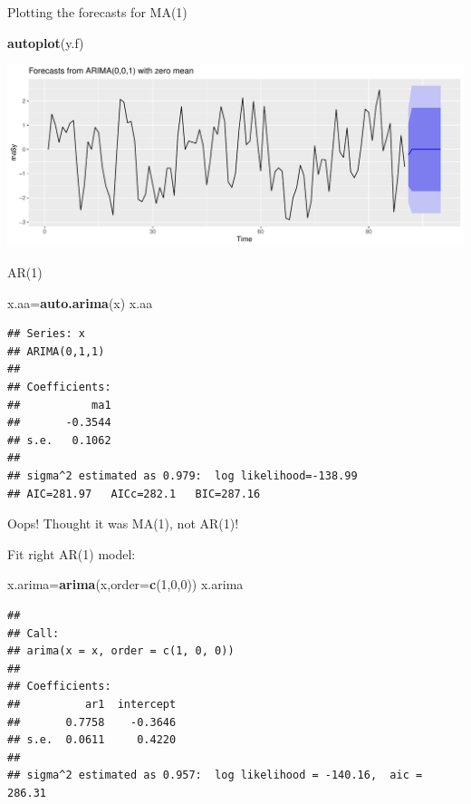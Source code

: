 \documentclass[
  ignorenonframetext,
]{beamer}
\newenvironment{Shaded}{\begin{snugshade}}{\end{snugshade}}
\newcommand{\DataTypeTok}[1]{\textcolor[rgb]{0.13,0.29,0.53}{#1}}
\newcommand{\DecValTok}[1]{\textcolor[rgb]{0.00,0.00,0.81}{#1}}
\newcommand{\KeywordTok}[1]{\textcolor[rgb]{0.13,0.29,0.53}{\textbf{#1}}}
\newcommand{\NormalTok}[1]{#1}
\begin{document}
\begin{frame}[fragile]{Plotting the forecasts for MA(1)}
\protect\hypertarget{plotting-the-forecasts-for-ma1}{}

\begin{Shaded}
\begin{Highlighting}[]
\KeywordTok{autoplot}\NormalTok{(y.f)}
\end{Highlighting}
\end{Shaded}

\includegraphics{slides_d29_files/figure-beamer/unnamed-chunk-567-1.pdf}

\end{frame}

\begin{frame}[fragile]{AR(1)}
\protect\hypertarget{ar1}{}

\begin{Shaded}
\begin{Highlighting}[]
\NormalTok{x.aa=}\KeywordTok{auto.arima}\NormalTok{(x)}
\NormalTok{x.aa}
\end{Highlighting}
\end{Shaded}

\begin{verbatim}
## Series: x 
## ARIMA(0,1,1) 
## 
## Coefficients:
##           ma1
##       -0.3544
## s.e.   0.1062
## 
## sigma^2 estimated as 0.979:  log likelihood=-138.99
## AIC=281.97   AICc=282.1   BIC=287.16
\end{verbatim}

Oops! Thought it was MA(1), not AR(1)!

\end{frame}

\begin{frame}[fragile]{Fit right AR(1) model:}
\protect\hypertarget{fit-right-ar1-model}{}

\begin{Shaded}
\begin{Highlighting}[]
\NormalTok{x.arima=}\KeywordTok{arima}\NormalTok{(x,}\DataTypeTok{order=}\KeywordTok{c}\NormalTok{(}\DecValTok{1}\NormalTok{,}\DecValTok{0}\NormalTok{,}\DecValTok{0}\NormalTok{))}
\NormalTok{x.arima}
\end{Highlighting}
\end{Shaded}

\begin{verbatim}
## 
## Call:
## arima(x = x, order = c(1, 0, 0))
## 
## Coefficients:
##          ar1  intercept
##       0.7758    -0.3646
## s.e.  0.0611     0.4220
## 
## sigma^2 estimated as 0.957:  log likelihood = -140.16,  aic = 286.31
\end{verbatim}

\end{frame}
\end{document}

